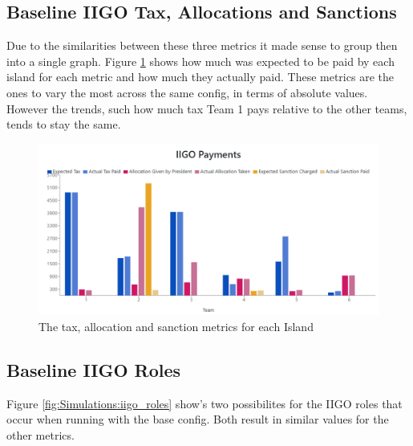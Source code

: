 \subsection{Baseline IIGO Tax, Allocations and Sanctions}
\label{subsec:Simulations:baseline:IIGO}

Due to the similarities between these three metrics it made sense to group then into a single graph. Figure \ref{fig:Simulations:IIGO_numbers} shows how much was expected to be paid by each island for each metric and how much they actually paid. These metrics are the ones to vary the most across the same config, in terms of absolute values. However the trends, such how much tax Team 1 pays relative to the other teams, tends to stay the same.

\begin{figure}[H] 
    \centering
    \includegraphics[width=1\textwidth]{15_simulations/images/baseline_iigo_tax_alloc_sanction.png}
    \caption{The tax, allocation and sanction metrics for each Island}
    \label{fig:Simulations:IIGO_numbers}
\end{figure} 
    

\subsection{Baseline IIGO Roles}
\label{subsec:Simulations:baseline:IIGO_roles}

Figure \ref{fig:Simulations:iigo_roles} show's two possibilites for the IIGO roles that occur when running with the base config. Both result in similar values for the other metrics.

